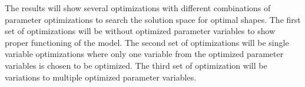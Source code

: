 \documentclass[default,iicol]{sn-jnl}
\theoremstyle{thmstyleone}%
\theoremstyle{thmstyletwo}%
\theoremstyle{thmstylethree}%
\begin{document}
The results will show several optimizations with different combinations of parameter optimizations to search the solution space for optimal shapes. The first set of optimizations will be without optimized parameter variables to show proper functioning of the model. The second set of optimizations will be single variable optimizations where only one variable from the optimized parameter variables is chosen to be optimized. The third set of optimization will be variations to multiple optimized parameter variables. 





\pagestyle{plain}
%
%
\end{document}
